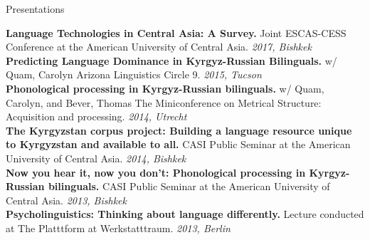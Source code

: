 \documentclass{resume} %
\begin{document}

\begin{minipage}{\textwidth}

\begin{rSection}{Presentations}
\vspace{.25cm}

  {\bf Language Technologies in Central Asia: A Survey.} {Joint ESCAS-CESS Conference at the American University of Central Asia.} \hfill {\em 2017, Bishkek} \\
  
{\bf Predicting Language Dominance in Kyrgyz-Russian Bilinguals.} {w/ Quam, Carolyn} {Arizona Linguistics Circle 9.} \hfill {\em 2015, Tucson} \\

{\bf Phonological processing in Kyrgyz-Russian bilinguals.} {w/ Quam, Carolyn, and Bever, Thomas}  {The Miniconference on Metrical Structure: Acquisition and processing.} \hfill {\em 2014, Utrecht} \\

{\bf The Kyrgyzstan corpus project: Building a language resource unique to Kyrgyzstan and available to all.} {CASI Public Seminar at the American University of Central Asia.} \hfill {\em 2014, Bishkek} \\

{\bf Now you hear it, now you don’t: Phonological processing in Kyrgyz-Russian bilinguals.} {CASI Public Seminar at the American University of Central Asia.} \hfill {\em 2013, Bishkek} \\

{\bf Psycholinguistics: Thinking about language differently.} {Lecture conducted at The Platttform at Werkstatttraum.} \hfill {\em 2013, Berlin} \\


\end{rSection}
\end{minipage}
\end{document}
